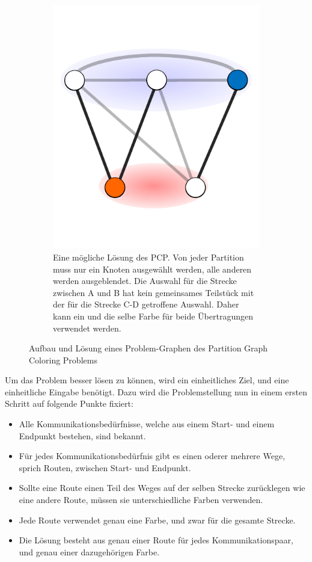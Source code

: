 \begin{figure}
\begin{subfigure}[t]{0.3\textwidth}
		\includegraphics[width=\textwidth]{img/bsp5}
		\caption{Eine mögliche Lösung des PCP. Von jeder Partition muss nur ein Knoten ausgewählt werden, alle anderen werden ausgeblendet. Die Auswahl
		für die Strecke zwischen A und B hat kein gemeinsames Teilstück mit der für die Strecke C-D getroffene Auswahl. Daher kann ein und die selbe Farbe
		für beide Übertragungen verwendet werden.}
		\label{fig:example:e}
	\end{subfigure}
	
	\caption{Aufbau und Lösung eines Problem-Graphen des Partition Graph Coloring Problems}
\end{figure}

Um das Problem besser lösen zu können, wird ein einheitliches Ziel, und eine einheitliche Eingabe benötigt.
Dazu wird die Problemstellung nun in einem ersten Schritt auf folgende Punkte fixiert:
\begin{itemize}
	\item Alle Kommunikationsbedürfnisse, welche aus einem Start- und einem Endpunkt bestehen, sind bekannt.
	\item Für jedes Kommunikationsbedürfnis gibt es einen oderer mehrere Wege, sprich Routen, zwischen Start- und Endpunkt.
	\item Sollte eine Route einen Teil des Weges auf der selben Strecke zurücklegen wie eine andere Route, müssen sie unterschiedliche Farben verwenden.
	\item Jede Route verwendet genau eine Farbe, und zwar für die gesamte Strecke.
	\item Die Lösung besteht aus genau einer Route für jedes Kommunikationspaar, und genau einer dazugehörigen Farbe.
\end{itemize}

